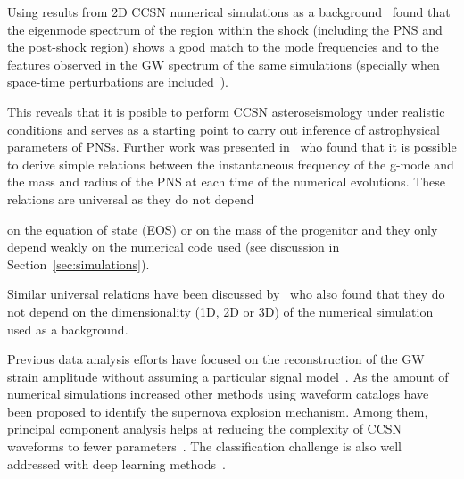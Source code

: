 Using results from 2D CCSN numerical simulations as a background~\citep{Torres:2018, Torres:2019a} found that the eigenmode spectrum of the region within the shock (including the PNS and the post-shock region) 
shows a good match to the mode frequencies and to the features observed in the GW spectrum of the same simulations (specially when space-time perturbations are included~\citep{Torres:2019a}).

This reveals that it is posible to perform CCSN asteroseismology {under realistic conditions} and serves as a starting point to carry out inference of astrophysical parameters of PNSs. Further work was presented in~\citep{Torres:2019b} who found that it is possible to derive simple relations between the instantaneous frequency of the g-mode and the mass and radius of the PNS {at each time of the numerical evolutions}. These relations are universal as they do not depend {on the equation of state (EOS) or on the mass of the progenitor {and they only depend weakly on} the numerical code used {(see discussion in Section~\ref{sec:simulations})}. {Similar universal relations have been discussed by~\citep{Sotani:2020a,Sotani:2020b} who also found that they do not depend on the dimensionality (1D, 2D or 3D) of the numerical simulation used as a background.

Previous data analysis efforts have focused on the reconstruction of the GW strain amplitude
without assuming a particular signal model~\citep{Summerscales:2008,Klimenko:2015ypf,CornLitt}. As the amount of numerical
simulations increased other methods using waveform catalogs have been proposed to identify
the supernova explosion mechanism.
Among them, principal component analysis helps at reducing the complexity of CCSN waveforms to fewer
parameters~\citep{Heng:2009,roever:09,Edwards:2014,powell:2016,powell:2017,Roma:2019kcd}.
The classification challenge is also well addressed with deep learning methods~\citep{astone:2018,Chan:2019fuz}.
    
}}
